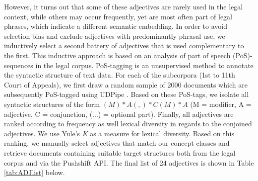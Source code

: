 \documentclass{article}
\begin{document}
However, it turns out that some of these adjectives are rarely used in the legal context, while others may occur frequently, yet are most often part of legal phrases, which indicate a different semantic embedding. In order to avoid selection bias and exclude adjectives with predominantly phrasal use, we inductively select a second battery of adjectives that is used complementary to the first. This inductive approach is based on an analysis of part of speech (PoS)-sequences in the legal corpus. PoS-tagging is an unsupervised method to annotate the syntactic structure of text data. For each of the subcorpora (1st to 11th Court of Appeals), we first draw a random sample of 2000 documents which are subsequently PoS-tagged using UDPipe \citep{Straka2017, Straka2020}. Based on these PoS-tags, we isolate all syntactic structures of the form $(M)*A(,)*C(M)*A$ (M = modifier, A = adjective, C = conjunction, (...) = optional part). Finally, all adjectives are ranked according to frequency as well lexical diversity in regards to the conjoined adjectives. We use Yule's \textit{K} \citep{Yule1944, Tweedie1998} as a measure for lexical diversity.  %
Based on this ranking, we manually select adjectives that match our concept classes and retrieve documents containing suitable target structures both from the legal corpus and via the Pushshift API. %
The final list of 24 adjectives is shown in Table \ref{tab:ADJlist} below.
\end{document}
